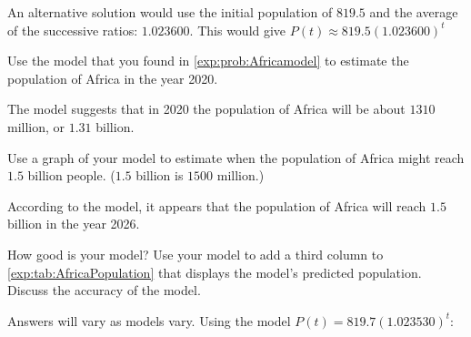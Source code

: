\begin{problem}
\begin{subproblem}
\begin{shortsolution}
		An alternative solution would use the initial population of $819.5$ and the average of the successive ratios: $1.023600$.  This would give $P(t)\approx819.5(1.023600)^t$
	\end{shortsolution}
\end{subproblem}
\begin{subproblem}
	Use the model that you found in \cref{exp:prob:Africamodel} to estimate the population of Africa in the year 2020.
	\begin{shortsolution}
		The model suggests that in 2020 the population of Africa will be about $1310$ million, or $1.31$ billion.
	\end{shortsolution}
\end{subproblem}
\begin{subproblem}
	Use a graph of your model to estimate when the population of Africa might reach $1.5$ billion people.  ($1.5$ billion is $1500$ million.)
	\begin{shortsolution}
		According to the model, it appears that the population of Africa will reach $1.5$ billion in the year 2026.
																			
	\end{shortsolution}
\end{subproblem}
\begin{subproblem}
	How good is your model?  Use your model to add a third column to  \cref{exp:tab:AfricaPopulation} that displays the model's predicted population.  Discuss the accuracy of the model.
	\begin{shortsolution}
		Answers will vary as models vary.  Using the model $P(t)=819.7(1.023530)^t$:\\
																			

\end{shortsolution}
\end{subproblem}
\end{problem}

